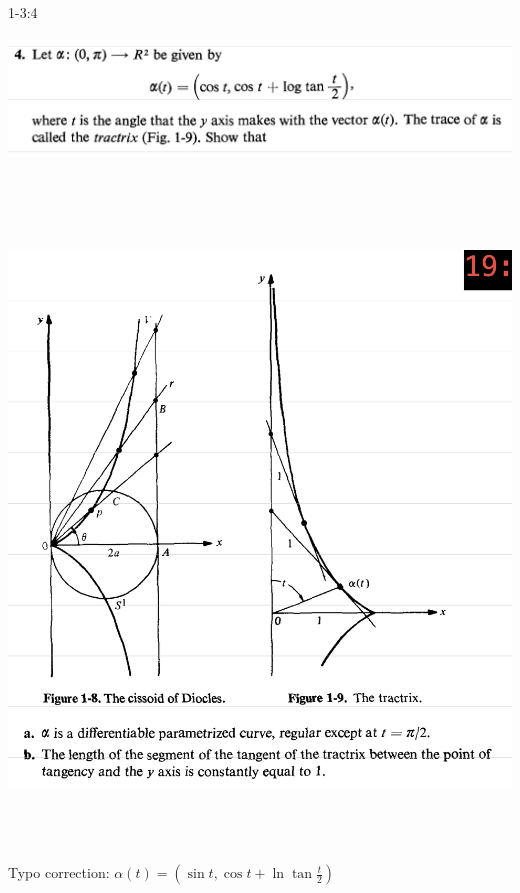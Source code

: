 \documentclass{report}
\begin{document}
\begin{question}{1-3:4}{}
\includegraphics[height=4cm,width=18cm]{3.png}
\includegraphics[height=18cm,width=18cm]{2.png}
Typo correction: $\alpha (t)=(\sin t,\cos t + \ln \tan \frac{t}{2})$
\end{question}
\end{document}
